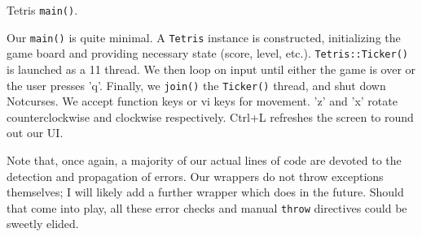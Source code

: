\begin{listing}[!htb]
\inputminted[]{C}{code-tetris/main.h}
\caption{Tetris \texttt{main()}.}
\label{list:tetris-main}
\end{listing}

Our \texttt{main()} is quite minimal. A \texttt{Tetris} instance is
constructed, initializing the game board and providing necessary state (score,
level, etc.). \texttt{Tetris::Ticker()} is launched as a {\CC}11 thread. We
then loop on input until either the game is over or the user presses 'q'.
Finally, we \texttt{join()} the \texttt{Ticker()} thread, and shut down
Notcurses. We accept function keys or vi keys for movement. 'z' and 'x' rotate
counterclockwise and clockwise respectively. Ctrl+L refreshes the screen to
round out our UI.

Note that, once again, a majority of our actual lines of code are devoted to
the detection and propagation of errors. Our \CC wrappers do not throw
exceptions themselves; I will likely add a further \CC wrapper which does in
the future. Should that come into play, all these error checks and manual
\texttt{throw} directives could be sweetly elided.
